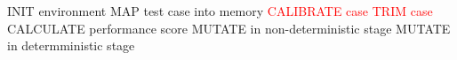 \begin{algorithm}
    INIT environment\;
    MAP test case into memory\;
    \textcolor{red}{CALIBRATE case}\;
    \textcolor{red}{TRIM case}\;
    CALCULATE performance score \;
    MUTATE in non-deterministic stage\;
    MUTATE in determministic stage\;
    \caption{$waffle-fuzz$}
    \label{algo:waffle-fuzz}
\end{algorithm}